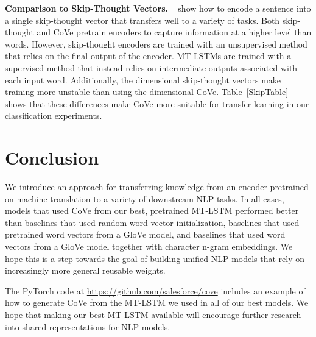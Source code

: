 \documentclass{article}
\begin{document}
\textbf{Comparison to Skip-Thought Vectors.}
~\citet{Kiros2015SkipThoughtV} show how to encode a sentence into a single skip-thought vector that transfers well to a variety of tasks.
Both skip-thought and CoVe pretrain encoders to capture information at a higher level than words. However, skip-thought encoders are trained with an unsupervised method that relies on the final output of the encoder. MT-LSTMs are trained with a supervised method that instead relies on intermediate outputs associated with each input word. Additionally, the  dimensional skip-thought vectors make training more unstable than using the  dimensional CoVe. Table~\ref{SkipTable} shows that these differences make CoVe more suitable for transfer learning in our classification experiments. 
\section{Conclusion}
We introduce an approach for transferring knowledge from an encoder pretrained on machine translation to a variety of downstream NLP tasks. 
In all cases, models that used CoVe from our best, pretrained MT-LSTM performed better than baselines that used random word vector initialization, baselines that used pretrained word vectors from a GloVe model, and baselines that used word vectors from a GloVe model together with character n-gram embeddings.
We hope this is a step towards the goal of building unified NLP models that rely on increasingly more general reusable weights.

The PyTorch code at \url{https://github.com/salesforce/cove} includes an example of how to generate CoVe from the MT-LSTM we used in all of our best models. We hope that making our best MT-LSTM available will encourage further research into shared representations for NLP models.

\small


\end{document}
